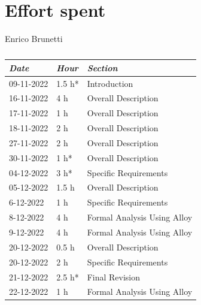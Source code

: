 \documentclass[a4paper]{report}
\begin{document}
\chapter{Effort spent}
\begin{table}[H]
\centering

Enrico Brunetti\\
\begin{tabular}{p{2cm}p{1.5cm}p{7cm}}
\toprule
\textit{Date} & \textit{Hour} & \textit{Section} \\ \midrule
09-11-2022 & 1.5 h* & Introduction \\ \midrule
16-11-2022 & 4 h & Overall Description \\ \midrule
17-11-2022 & 1 h & Overall Description\\ \midrule
18-11-2022 & 2 h & Overall Description \\ \midrule
27-11-2022 & 2 h & Overall Description \\ \midrule
30-11-2022 & 1 h* & Overall Description \\ \midrule
04-12-2022 & 3 h* & Specific Requirements \\ \midrule
05-12-2022 & 1.5 h & Overall Description\\ \midrule
6-12-2022 & 1 h & Specific Requirements\\  \midrule
8-12-2022 & 4 h & Formal Analysis Using Alloy\\  \midrule
9-12-2022 & 4 h & Formal Analysis Using Alloy\\ \midrule
20-12-2022 & 0.5 h & Overall Description\\ \midrule
20-12-2022 & 2 h & Specific Requirements\\ \midrule
21-12-2022 & 2.5 h* & Final Revision \\ \midrule
22-12-2022 & 1 h & Formal Analysis Using Alloy \\ \midrule

\bottomrule
\end{tabular}
\caption[Enrico Brunetti's effort table]{}
\end{table}
\end{document}
